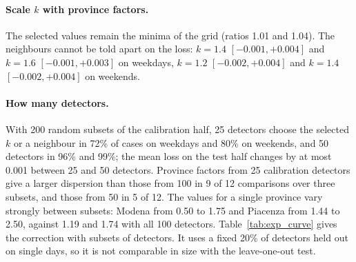 \documentclass[11pt,a4paper]{article}
\begin{document}
\begin{table}[htbp]
\centering
\caption{Route-choice variants on the final model: Spearman correlation with GPS counts in Forl\`i--Cesena, and 95\% interval of the difference from the selected variant, paired over links.}
\label{tab:exp_routing}
\resizebox{\textwidth}{!}{}
\end{table}

\begin{table}[htbp]
\centering
\caption{Speeds and usage weights at detectors outside Forl\`i--Cesena, final model: Spearman correlation and 95\% paired intervals. V0: shortest distance, default speeds. V1: shortest distance, GPS speeds. D1: usage cost and class weights, default speeds. V6: usage cost and class weights, GPS speeds.}
\label{tab:exp_separation}
\resizebox{\textwidth}{!}{}
\end{table}

\begin{table}[htbp]
\centering
\caption{Cost weights on the calibration detectors, final model (selected: dispersion 0.185, Spearman 0.736). Weights: $100\alpha$ and $100\alpha_s$. Interval of the change in dispersion from the selected weights, 95\% paired.}
\label{tab:exp_alpha}

\end{table}

\paragraph{Scale $k$ with province factors.} The selected values remain the minima of the grid (ratios 1.01 and 1.04). The neighbours cannot be told apart on the loss: $k=1.4$ $[-0.001, +0.004]$ and $k=1.6$ $[-0.001, +0.003]$ on weekdays, $k=1.2$ $[-0.002, +0.004]$ and $k=1.4$ $[-0.002, +0.004]$ on weekends.

\paragraph{How many detectors.} With 200 random subsets of the calibration half, 25 detectors choose the selected $k$ or a neighbour in 72\% of cases on weekdays and 80\% on weekends, and 50 detectors in 96\% and 99\%; the mean loss on the test half changes by at most 0.001 between 25 and 50 detectors. Province factors from 25 calibration detectors give a larger dispersion than those from 100 in 9 of 12 comparisons over three subsets, and those from 50 in 5 of 12. The values for a single province vary strongly between subsets: Modena from 0.50 to 1.75 and Piacenza from 1.44 to 2.50, against 1.19 and 1.74 with all 100 detectors. Table~\ref{tab:exp_curve} gives the correction with subsets of detectors. It uses a fixed 20\% of detectors held out on single days, so it is not comparable in size with the leave-one-out test.
\end{document}
